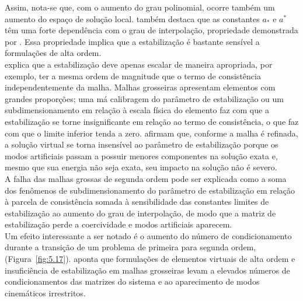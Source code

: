 \indent Assim, nota-se que, com o aumento do grau polinomial, ocorre também um aumento do espaço de solução local. \citet{illconditioningvirtualelementmethodstabilizationsbases2018} também destaca que as constantes $a_*$ e $a^*$ têm uma forte dependência com o grau de interpolação, propriedade demonstrada por \citet{exponentialconvergencehpvirtualelementmethodpresencecornersingularities2018}. Essa propriedade implica que a estabilização é bastante sensível a formulações de alta ordem.\\
\indent \citet{engineeringperspectivevirtualelementmethoditsinterplaystandardfiniteelementmethod2019a} explica que a estabilização deve apenas escalar de maneira apropriada, por exemplo, ter a mesma ordem de magnitude que o termo de consistência independentemente da malha. Malhas grosseiras apresentam elementos com grandes proporções; uma má calibragem do parâmetro de estabilização ou um subdimensionamento em relação à escala física do elemento faz com que a estabilização se torne insignificante em relação ao termo de consistência, o que faz com que o limite inferior tenda a zero. \citet{quantitativestudystabilizationparametervirtualelementmethod2024} afirmam que, conforme a malha é refinada, a solução virtual se torna insensível ao parâmetro de estabilização porque os modos artificiais passam a possuir menores componentes na solução exata e, mesmo que sua energia não seja exata, seu impacto na solução não é severo.\\
\indent A falha das malhas grossas de segunda ordem pode ser explicada como a soma dos fenômenos de subdimensionamento do parâmetro de estabilização em relação à parcela de consistência somada à sensibilidade das constantes limites de estabilização ao aumento do grau de interpolação, de modo que a matriz de estabilização perde a coercividade e modos artificiais aparecem.\\
\indent Um efeito interessante a ser notado é o aumento do número de condicionamento durante a transição de um problema de primeira para segunda ordem, (Figura~\ref{fig:5.17}). \citet{virtualelementmethodtopologyoptimizationpolygonalmeshesnumericalstudy2016} aponta que formulações de elementos virtuais de alta ordem e insuficiência de estabilização em malhas grosseiras levam a elevados números de condicionamentos das matrizes do sistema e ao aparecimento de modos cinemáticos irrestritos.

